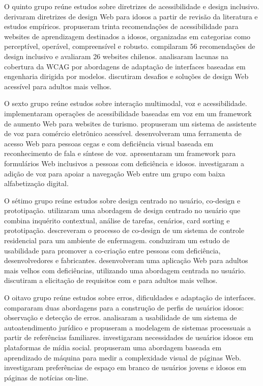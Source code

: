 O quinto grupo reúne estudos sobre diretrizes de acessibilidade e design inclusivo. \cite{kurniawan2005research} derivaram diretrizes de design Web para idosos a partir de revisão da literatura e estudos empíricos. \cite{sun2010preliminary} propuseram trinta recomendações de acessibilidade para websites de aprendizagem destinados a idosos, organizadas em categorias como perceptível, operável, compreensível e robusto. \cite{dombrovskaia2021guideline} compilaram 56 recomendações de design inclusivo e avaliaram 26 websites chilenos. \cite{wickramathilaka2023addressing} analisaram lacunas na cobertura da WCAG por abordagens de adaptação de interfaces baseadas em engenharia dirigida por modelos. \cite{chiriboga2025accessible} discutiram desafios e soluções de design Web acessível para adultos mais velhos.

O sexto grupo reúne estudos sobre interação multimodal, voz e acessibilidade. \cite{gonzalez2025augmenting} implementaram operações de acessibilidade baseadas em voz em um framework de aumento Web para websites de turismo. \cite{ramineni2024enhancing} propuseram um sistema de assistente de voz para comércio eletrônico acessível. \cite{kusumaningayu2017web} desenvolveram uma ferramenta de acesso Web para pessoas cegas e com deficiência visual baseada em reconhecimento de fala e síntese de voz. \cite{halbach2009framework} apresentaram um framework para formulários Web inclusivos a pessoas com deficiência e idosos. \cite{gautam2019adding} investigaram a adição de voz para apoiar a navegação Web entre um grupo com baixa alfabetização digital.

O sétimo grupo reúne estudos sobre design centrado no usuário, co-design e prototipação. \cite{balakrishnan2012user} utilizaram uma abordagem de design centrado no usuário que combina inquérito contextual, análise de tarefas, cenários, card sorting e prototipação. \cite{kymäläinen2012creating} descreveram o processo de co-design de um sistema de controle residencial para um ambiente de enfermagem. \cite{ro2024usability} conduziram um estudo de usabilidade para promover a co-criação entre pessoas com deficiência, desenvolvedores e fabricantes. \cite{breaking_barriers} desenvolveram uma aplicação Web para adultos mais velhos com deficiências, utilizando uma abordagem centrada no usuário. \cite{sustar2008requirements} discutiram a elicitação de requisitos com e para adultos mais velhos.

O oitavo grupo reúne estudos sobre erros, dificuldades e adaptação de interfaces. \cite{taylor2009using} compararam duas abordagens para a construção de perfis de usuários idosos: observação e detecção de erros. \cite{mastarone2007access} analisaram a usabilidade de um sistema de autoatendimento jurídico e propuseram a modelagem de sistemas processuais a partir de referências familiares. \cite{social_media_elderly} investigaram necessidades de usuários idosos em plataformas de mídia social. \cite{sadeghi2020hci} propuseram uma abordagem baseada em aprendizado de máquina para medir a complexidade visual de páginas Web. \cite{ko2019old} investigaram preferências de espaço em branco de usuários jovens e idosos em páginas de notícias on-line.

